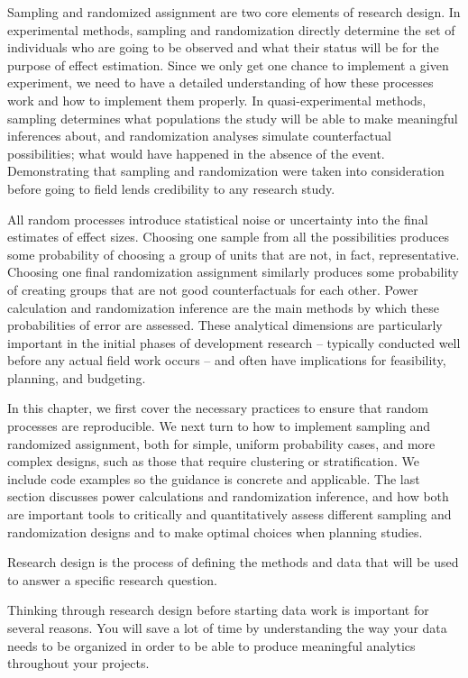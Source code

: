 
\begin{fullwidth}
	Sampling and randomized assignment are two core elements of research design.
	In experimental methods, sampling and randomization directly determine
	the set of individuals who are going to be observed
	and what their status will be for the purpose of effect estimation.
	Since we only get one chance to implement a given experiment,
	we need to have a detailed understanding of how these processes work
	and how to implement them properly.
	In quasi-experimental methods, sampling determines what populations the study
	will be able to make meaningful inferences about,
	and randomization analyses simulate counterfactual possibilities;
	what would have happened in the absence of the event.
	Demonstrating that sampling and randomization were taken into consideration
	before going to field lends credibility to any research study.
	
	All random processes introduce statistical noise
	or uncertainty into the final estimates of effect sizes.
	Choosing one sample from all the possibilities produces some probability of
	choosing a group of units that are not, in fact, representative.
	Choosing one final randomization assignment similarly produces some probability of
	creating groups that are not good counterfactuals for each other.
	Power calculation and randomization inference
	are the main methods by which these probabilities of error are assessed.
	These analytical dimensions are particularly important in the initial phases of development research --
	typically conducted well before any actual field work occurs --
	and often have implications for feasibility, planning, and budgeting.
	
	In this chapter, we first cover the necessary practices to ensure that random processes are reproducible.
	We next turn to how to implement sampling and randomized assignment,
	both for simple, uniform probability cases, and more complex designs,
	such as those that require clustering or stratification.
	We include code examples so the guidance is concrete and applicable.
	The last section discusses power calculations and randomization inference,
	and how both are important tools to critically and quantitatively assess different
	sampling and randomization designs and to make optimal choices when planning studies.
	
	
	
	Research design is the process of defining the methods and data
	that will be used to answer a specific research question.
	
	
	Thinking through research design before starting data work is important for several reasons. You will save a lot of time by understanding the way
	your data needs to be organized
	in order to be able to produce meaningful analytics throughout your projects.
	
	
\end{fullwidth}


